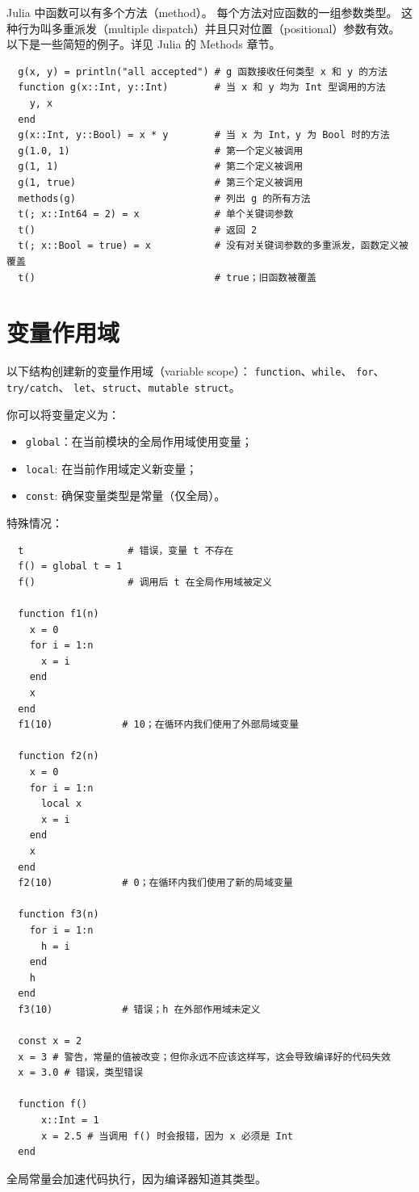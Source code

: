 \documentclass[10pt,a4paper]{article}
\begin{document}
Julia 中\textsf{函数}可以有多个\textsf{方法}（method）。
每个方法对应函数的一组参数类型。
这种行为叫多重派发（multiple dispatch）并且只对位置（positional）参数有效。
以下是一些简短的例子。详见 Julia 的 Methods 章节。
\begin{lstlisting}
  g(x, y) = println("all accepted") # g 函数接收任何类型 x 和 y 的方法
  function g(x::Int, y::Int)        # 当 x 和 y 均为 Int 型调用的方法
    y, x
  end
  g(x::Int, y::Bool) = x * y        # 当 x 为 Int，y 为 Bool 时的方法
  g(1.0, 1)                         # 第一个定义被调用
  g(1, 1)                           # 第二个定义被调用
  g(1, true)                        # 第三个定义被调用
  methods(g)                        # 列出 g 的所有方法
  t(; x::Int64 = 2) = x             # 单个关键词参数
  t()                               # 返回 2
  t(; x::Bool = true) = x           # 没有对关键词参数的多重派发，函数定义被覆盖
  t()                               # true；旧函数被覆盖
\end{lstlisting}

\section{变量作用域}
以下结构创建新的变量作用域（variable scope）：
\lstinline|function|、\lstinline|while|、
\lstinline|for|、\lstinline|try/catch|、
\lstinline|let|、\lstinline|struct|、\lstinline|mutable struct|。

你可以将变量定义为：
\begin{itemize}
  \item \lstinline|global|：在当前模块的全局作用域使用变量；
  \item \lstinline|local|: 在当前作用域定义新变量；
  \item \lstinline|const|: 确保变量类型是常量（仅全局）。
\end{itemize}

特殊情况：
\begin{lstlisting}
  t                  # 错误，变量 t 不存在
  f() = global t = 1
  f()                # 调用后 t 在全局作用域被定义

  function f1(n)
    x = 0
    for i = 1:n
      x = i
    end
    x
  end
  f1(10)            # 10；在循环内我们使用了外部局域变量

  function f2(n)
    x = 0
    for i = 1:n
      local x
      x = i
    end
    x
  end
  f2(10)            # 0；在循环内我们使用了新的局域变量

  function f3(n)
    for i = 1:n
      h = i
    end
    h
  end
  f3(10)            # 错误；h 在外部作用域未定义

  const x = 2
  x = 3 # 警告，常量的值被改变；但你永远不应该这样写，这会导致编译好的代码失效
  x = 3.0 # 错误，类型错误

  function f()
      x::Int = 1
      x = 2.5 # 当调用 f() 时会报错，因为 x 必须是 Int
  end
\end{lstlisting}
全局常量会加速代码执行，因为编译器知道其类型。
\end{document}
